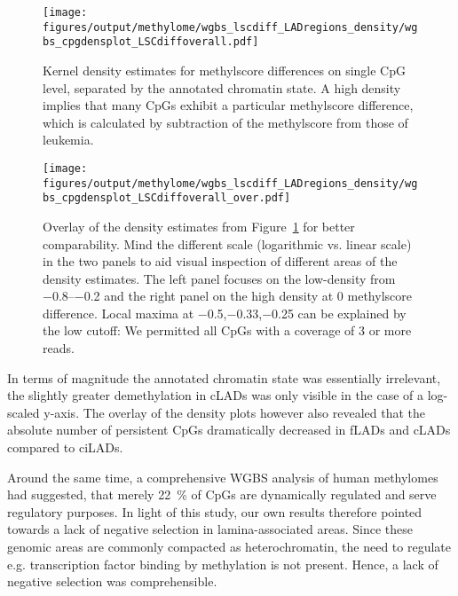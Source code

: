 
\begin{figure}[!ht]
	\centering
	\texttt{[image: figures/output/methylome/wgbs\_lscdiff\_LADregions\_density/wgbs\_cpgdensplot\_LSCdiffoverall.pdf]} 
	\caption{Kernel density estimates for methylscore differences on single CpG level, separated by the annotated chromatin state\cite{Meuleman2013}. A high density implies that many CpGs exhibit a particular methylscore difference, which is calculated by subtraction of the \dnmtchip \kitpos methylscore from those of \dnmtwt \kitpos leukemia.}
	\label{fig:wgbs_cpgdensplot_LSCdiffoverall}
\end{figure}

\begin{figure}[!ht]
	\centering
	\texttt{[image: figures/output/methylome/wgbs\_lscdiff\_LADregions\_density/wgbs\_cpgdensplot\_LSCdiffoverall\_over.pdf]} 
	\caption{Overlay of the density estimates from {\color{fbbioblue}Figure~}\ref{fig:wgbs_cpgdensplot_LSCdiffoverall} for better comparability. Mind the different scale (logarithmic vs. linear scale) in the two panels to aid visual inspection of different areas of the density estimates. The left panel focuses on the low-density from \numrange{-0.8}{-0.2} and the right panel on the high density at \num{0} methylscore difference. Local maxima at \num{-0.5},\num{-0.33},\num{-0.25} can be explained by the low cutoff: We permitted all CpGs with a coverage of 3 or more reads.}
	\label{fig:wgbs_cpgdensplot_LSCdiffoverall_over}
\end{figure}

In terms of magnitude the annotated chromatin state was essentially irrelevant, the slightly greater demethylation in cLADs was only visible in the case of a log-scaled y-axis. The overlay of the density plots however also revealed that the absolute number of persistent CpGs dramatically decreased in fLADs and cLADs compared to ciLADs.

Around the same time, a comprehensive WGBS analysis of human methylomes had suggested, that merely \SI{22}{\percent} of CpGs are dynamically regulated and serve regulatory purposes\cite{Ziller2013}. In light of this study, our own results therefore pointed towards a lack of negative selection in lamina-associated areas. Since these genomic areas are commonly compacted as heterochromatin\cite{Guelen2008}, the need to regulate e.g. transcription factor binding by methylation \cite{Stadler2011} is not present. Hence, a lack of negative selection was comprehensible. 

